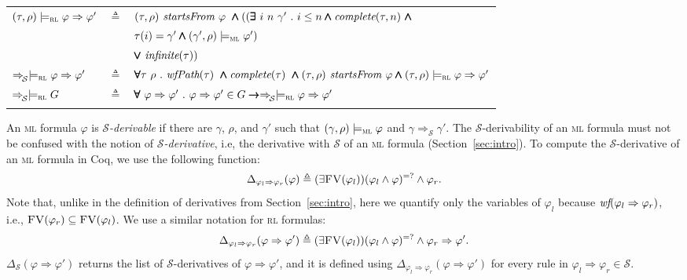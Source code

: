 \documentclass[conference]{IEEEtran}
\newcommand{\eqbydef}{\triangleq}
\renewcommand{\S}{\mathcal{S}}
\newcommand{\tran}[2]{\Ra^{\!#1}_{\!#2}}
\newcommand{\Ra}{\Rightarrow}
\newcommand{\FreeVars}{\mathit{\textsc{FV}}}
\newcommand{\ML}{\textsc{ml}\xspace}
\newcommand{\RL}{\textsc{rl}\xspace}
\newcommand{\rrule}[2]{{#1} \Ra{#2}}
\newcommand{\modelsml}{\models_\ML}
\newcommand{\modelsrl}{\models_\RL}
\newcommand{\coq}[1]{{\small \textit{#1}}}
\newcommand{\coqtt}[1]{{\small \texttt{#1}}}
\newcommand{\cand}{\pmb{\land}}
\newcommand{\cor}{\pmb{\lor}}
\newcommand{\cexists}{\pmb{\exists}}
\newcommand{\cforall}{\pmb{\forall}}
\newcommand{\cimplies}{\pmb{\rightarrow}}
\begin{document}
\noindent
\begin{minipage}{\textwidth}
\begin{tabular}{lll}
$(\tau, \rho) \modelsrl \rrule{\varphi}{\varphi'}$ &\hspace{-3ex}$\eqbydef$&\hspace{-3ex}$(\tau, \rho) \coq{ startsFrom } \varphi ~\cand ((\cexists~i~n~\gamma'~.~i \leq n \cand \coq{complete}(\tau, n)~\cand$\\
&& \hspace{31ex}$ \tau(i) = \gamma' \cand (\gamma', \rho) \modelsml \varphi')$\\
&& \hspace{-1ex}$ \cor~\coq{infinite}(\tau))$\\[1ex]
$\tran{}{\S}\modelsrl \rrule{\varphi}{\varphi'}$ &\hspace{-3ex}$\eqbydef$&\hspace{-3ex}$\cforall \tau~\rho~.~\coq{wfPath}(\tau)~\cand \coq{complete}(\tau)~\cand (\tau, \rho) \coq{ startsFrom } \varphi  \cand (\tau, \rho) \modelsrl \rrule{\varphi}{\varphi'} $\\[1ex]
$\tran{}{\S}\modelsrl G$ &\hspace{-3ex}$\eqbydef$&\hspace{-3ex}$\cforall~\rrule{\varphi}{\varphi'}~.~\rrule{\varphi}{\varphi'} \in G \cimplies \tran{}{\S}\modelsrl\rrule{\varphi}{\varphi'}$\\\\[1ex]
\end{tabular}
\end{minipage}


An \ML formula $\varphi$ is \emph{$\S$-derivable} if there are $\gamma$, $\rho$, and $\gamma'$ such that $(\gamma, \rho)\modelsml \varphi$ and $\gamma \tran{}{\S} \gamma'$. 
The $\S$-derivability of an \ML formula must not be confused with the notion of \emph{$\S$-derivative}, i.e, the derivative with $\S$ of an \ML formula (Section~\ref{sec:intro}).
To compute the $\S$-derivative of an  \ML formula in Coq, we use the following function:
$$\Delta_{\rrule{\varphi_l}{\varphi_r}}(\varphi) \eqbydef (\exists \FreeVars(\varphi_l)) (\varphi_l \land \varphi)^{=?} \land \varphi_r.$$
Note that, unlike in the definition of derivatives from Section~\ref{sec:intro}, here we quantify only the variables of $\varphi_l$ because $\coq{wf}(\rrule{\varphi_l}{\varphi_r})$, i.e., $\FreeVars(\varphi_r) \subseteq \FreeVars(\varphi_l)$.
We use a similar notation for \RL formulas: 
$$\Delta_{\rrule{\varphi_l}{\varphi_r}}(\rrule{\varphi}{\varphi'}) \eqbydef \rrule{(\exists \FreeVars(\varphi_l)) (\varphi_l \land \varphi)^{=?} \land \varphi_r}{\varphi'}.$$
$\Delta_\S(\rrule{\varphi}{\varphi'})$ returns the list of $\S$-derivatives of $\rrule{\varphi}{\varphi'}$, and it is defined using $\Delta_{\rrule{\varphi_l}{\varphi_r}}(\rrule{\varphi}{\varphi'})$ for every rule in $\rrule{\varphi_l}{\varphi_r}\in\S$.\\
\end{document}

